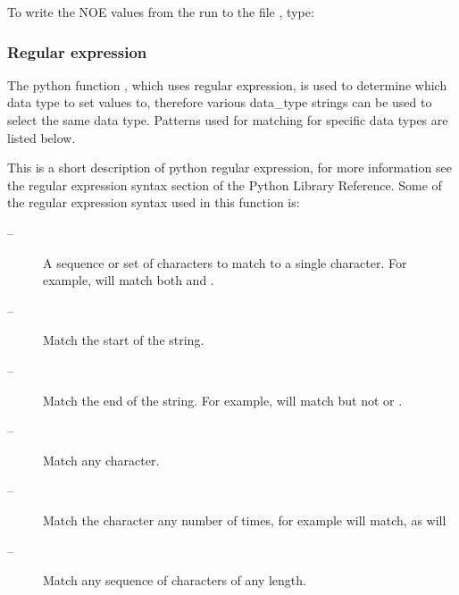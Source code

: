 
To write the NOE values from the run  to the file , type:







\subsubsection{Regular expression}

The python function , which uses regular expression, is used to determine which data type to set values to, therefore various data\_type strings can be used to select the same data type.  Patterns used for matching for specific data types are listed below.


This is a short description of python regular expression, for more information see the regular expression syntax section of the Python Library Reference.  Some of the regular expression syntax used in this function is:


\begin{description}
\item[\quotecmd{[]} --]  A sequence or set of characters to match to a single character.  For example,  will match both  and . 
\item[\quotecmd{\^{}} --]  Match the start of the string. 
\item[\quotecmd{\$} --]  Match the end of the string.  For example,  will match  but not  or . 
\item[ --]  Match any character. 
\item[ --]  Match the character  any number of times, for example  will match, as will  
\item[ --]  Match any sequence of characters of any length. 
\end{description}



